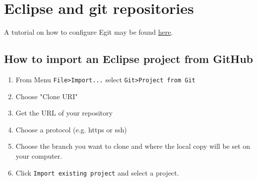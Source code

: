 \documentclass{openetcs_report}
\begin{document}
\section{Eclipse and  git repositories}
A tutorial on how to configure Egit may be found  \href{http://eclipsesource.com/blogs/tutorials/egit-tutorial/}{here}.
\subsection{How to import an Eclipse project from GitHub}
\begin{enumerate}
\item From Menu 
\verb+File>Import...+ select \verb+Git>Project from Git+
\item Choose "Clone URI"
\item Get the URL of your repository
\item Choose a protocol (e.g. https or ssh)
\item Choose the branch you want to clone and where the local copy
  will be set on your computer.
\item Click \verb+Import existing project+ and  select a project.

\end{enumerate}



\end{document}
